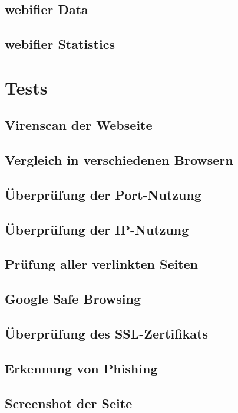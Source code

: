 
\subsection{webifier Data}


\subsection{webifier Statistics}


\section{Tests}

\subsection{Virenscan der Webseite}


\subsection{Vergleich in verschiedenen Browsern}


\subsection{Überprüfung der Port-Nutzung}


\subsection{Überprüfung der IP-Nutzung}


\subsection{Prüfung aller verlinkten Seiten}


\subsection{Google Safe Browsing}


\subsection{Überprüfung des SSL-Zertifikats}


\subsection{Erkennung von Phishing}


\subsection{Screenshot der Seite}

